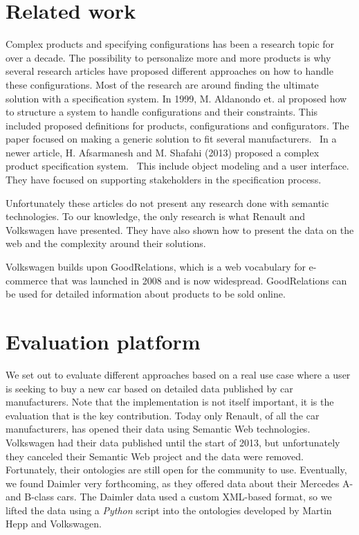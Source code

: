 \documentclass{llncs}
\begin{document}
\section{Related work}
Complex products and specifying configurations has been a research
topic for over a decade.  The possibility to personalize more and more
products is why several research articles have proposed different
approaches on how to handle these configurations. Most of the research
are around finding the ultimate solution with a specification
system. In 1999, M. Aldanondo et. al proposed how to structure a
system to handle configurations and their constraints. This included
proposed definitions for products, configurations and
configurators. The paper focused on making a generic solution to fit
several manufacturers.~\cite{OldConf} In a newer article,
H. Afsarmanesh and M. Shafahi (2013) proposed a complex product
specification system.~\cite{NewConf} This include object modeling and
a user interface. They have focused on supporting stakeholders in the
specification process.

Unfortunately these articles do not present any research done with
semantic technologies. To our knowledge, the only research is what
Renault and Volkswagen have presented. They have also shown how to
present the data on the web and the complexity around their solutions.

Volkswagen builds upon GoodRelations\cite{GRQual}, which
is a web vocabulary for e-commerce that was launched in 2008 and is now
widespread.  GoodRelations can be used for detailed information about
products to be sold online.


\section{Evaluation platform}

We set out to evaluate different approaches based on a real use case
where a user is seeking to buy a new car based on detailed data
published by car manufacturers. Note that the implementation is not
itself important, it is the evaluation that is the key
contribution. Today only Renault, of all the car manufacturers, has
opened their data using Semantic Web technologies. Volkswagen had
their data published until the start of 2013, but unfortunately they
canceled their Semantic Web project and the data were removed.
Fortunately, their ontologies are still open for the community to
use. Eventually, we found Daimler very forthcoming, as they offered
data about their Mercedes A- and B-class cars.  The Daimler data used
a custom XML-based format, so we lifted the data using a
\textit{Python} script into the ontologies developed by Martin Hepp
and Volkswagen.
\end{document}
